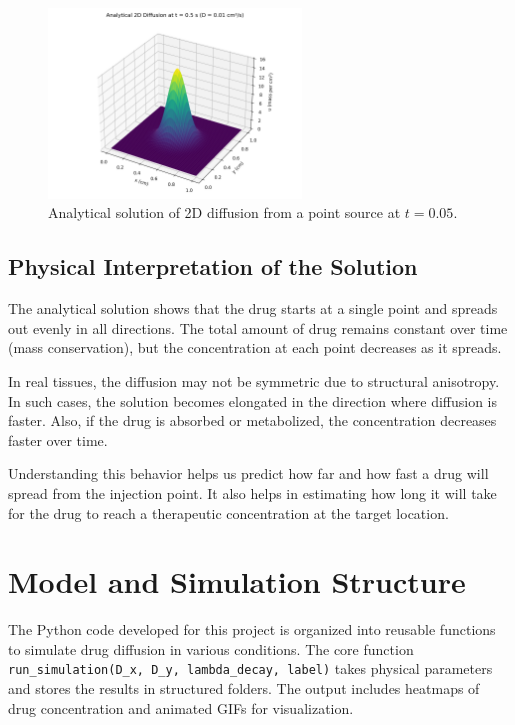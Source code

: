\documentclass[11pt, a4paper]{article}
\begin{document}
\begin{figure}[h!]
  \centering
  \includegraphics[width=0.6\textwidth]{resources/figures/analytical_solution.png}
  \caption{Analytical solution of 2D diffusion from a point source at \( t = 0.05 \).}
  \label{fig:analytical}
\end{figure}

\subsection{Physical Interpretation of the Solution}
The analytical solution shows that the drug starts at a single point and spreads out evenly in all directions. The total amount of drug remains constant over time (mass conservation), but the concentration at each point decreases as it spreads.

In real tissues, the diffusion may not be symmetric due to structural anisotropy. In such cases, the solution becomes elongated in the direction where diffusion is faster. Also, if the drug is absorbed or metabolized, the concentration decreases faster over time.

Understanding this behavior helps us predict how far and how fast a drug will spread from the injection point. It also helps in estimating how long it will take for the drug to reach a therapeutic concentration at the target location.

\section{Model and Simulation Structure}

The Python code developed for this project is organized into reusable functions to simulate drug diffusion in various conditions. The core function \texttt{run\_simulation(D\_x, D\_y, lambda\_decay, label)} takes physical parameters and stores the results in structured folders. The output includes heatmaps of drug concentration and animated GIFs for visualization.
\end{document}
